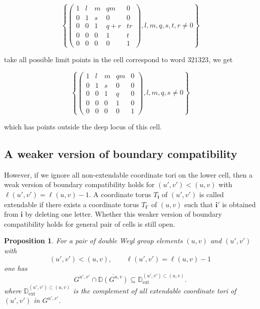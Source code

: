 \documentclass[12pt]{amsart}
\newcommand{\D}{\mathbb D}
\newcommand{\bi}{\mathbf i}
\theoremstyle{plain}
\newtheorem{proposition}[theorem]{Proposition}
\theoremstyle{definition}
\theoremstyle{remark}
\begin{document}
\[\left\{
\begin{pmatrix}
1 & l & m &qm & 0\\
0 & 1 & s & 0 & 0\\
0 & 0 & 1& q+r & tr\\
0 & 0 & 0 & 1 & t\\
0 & 0 & 0 & 0 & 1
\end{pmatrix},l,m,q,s,t,r \neq 0\right\}
\]

take all possible limit points in the cell correspond to word $321323$, we get

\[\left\{
\begin{pmatrix}
1 & l & m &qm & 0\\
0 & 1 & s & 0 & 0\\
0 & 0 & 1& q & 0\\
0 & 0 & 0 & 1 & 0\\
0 & 0 & 0 & 0 & 1
\end{pmatrix},l,m,q,s
 \neq 0\right\}
\]

which has points outside the deep locus of this cell.

\subsection{A weaker version of boundary compatibility}
However, if we ignore all non-extendable coordinate tori on the lower cell, then a weak version of boundary compatibility holds for $(u',v')<(u,v)$ with $\ell(u',v')=\ell(u,v)-1$. A coordinate torus $T_\bi$ of $(u',v')$ is called extendable if there exists a coordinate torus $T_{\bi'}$ of $(u,v)$ such that $\bi'$ is obtained from $\bi$ by deleting one letter. Whether this weaker version of boundary compatibility holds for general pair of cells is still open.

\begin{proposition}
   For a pair of double Weyl group elements $(u,v)$ and $(u',v')$ with
\[
(u',v') < (u,v),\qquad \ell(u',v')=\ell(u,v)-1
\]
one has
\[
G^{u',v'}
\cap
\overline{\D(G^{u,v})}
\subseteq
\D_{\mathrm{ext}}^{(u',v')\subset(u,v)}.
\]
where $\D_{\mathrm{ext}}^{(u',v')\subset(u,v)}$ is the complement of all extendable coordinate tori of $(u',v')$ in $G^{u',v'}$.

\end{proposition}
\end{document}
